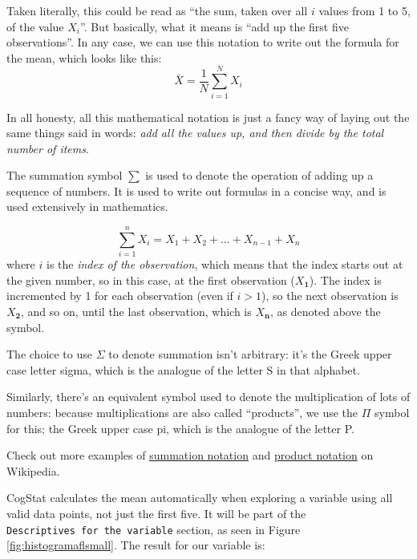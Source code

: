 \documentclass[
  11pt,
]{book}
\theoremstyle{definition}
\theoremstyle{definition}
\theoremstyle{definition}
\theoremstyle{definition}
\theoremstyle{remark}
\begin{document}
Taken literally, this could be read as ``the sum, taken over all \(i\) values from 1 to 5, of the value \(X_i\)''. But basically, what it means is ``add up the first five observations''. In any case, we can use this notation to write out the formula for the mean, which looks like this:
\[
\bar{X} = \frac{1}{N} \sum_{i=1}^N X_i 
\]

In all honesty, all this mathematical notation is just a fancy way of laying out the same things said in words: \emph{add all the values up, and then divide by the total number of items}.

\hypertarget{summation}{}
\begin{callout}

The summation symbol \(\scriptstyle\sum\) is used to denote the operation of adding up a sequence of numbers. It is used to write out formulas in a concise way, and is used extensively in mathematics.

\[
\sum_{i=1}^n X_i = X_1 + X_2 + ... + X_{n-1} + X_n
\]
where \(i\) is the \emph{index of the observation}, which means that the index starts out at the given number, so in this case, at the first observation (\(X_\mathbf{1}\)). The index is incremented by 1 for each observation (even if \(i>1\)), so the next observation is \(X_\mathbf{2}\), and so on, until the last observation, which is \(X_\mathbf{n}\), as denoted above the symbol.

The choice to use \(\Sigma\) to denote summation isn't arbitrary: it's the Greek upper case letter sigma, which is the analogue of the letter S in that alphabet.

Similarly, there's an equivalent symbol used to denote the multiplication of lots of numbers: because multiplications are also called ``products'', we use the \(\Pi\) symbol for this; the Greek upper case pi, which is the analogue of the letter P.

Check out more examples of \href{https://en.wikipedia.org/wiki/Summation\#Capital-sigma_notation}{summation notation} and \href{https://en.wikipedia.org/wiki/Multiplication\#Product_of_a_sequence}{product notation} on Wikipedia.

\end{callout}

CogStat calculates the mean automatically when exploring a variable using all valid data points, not just the first five. It will be part of the \texttt{Descriptives\ for\ the\ variable} section, as seen in Figure \ref{fig:histogramaflsmall}. The result for our variable is:
\end{document}
